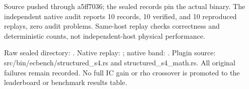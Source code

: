 \documentclass[10pt]{article}
\begin{document}
Source pushed through a5ff7036; the sealed records pin the actual binary.
The independent native audit reports 10 records,
10 verified, and 10 reproduced
replays, zero audit problems. Same-host replay checks correctness and
deterministic counts, not independent-host physical performance.

Raw sealed directory: .
Native replay: ;
native band: .
Plugin source: src/bin/ecbench/structured_s4.rs and structured_s4_math.rs.
All original failures remain recorded. No full IC gain or rho crossover
is promoted to the leaderboard or benchmark results table.
\end{document}
